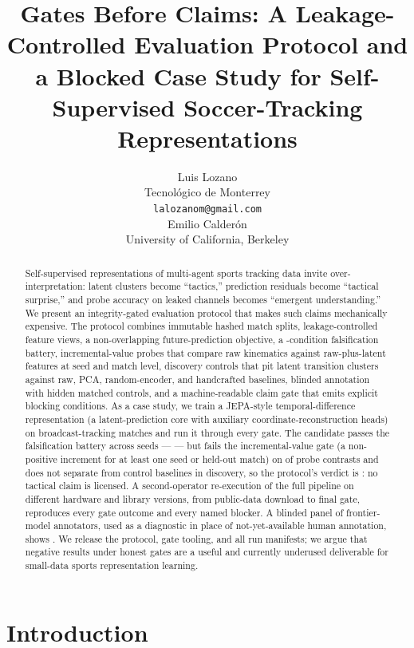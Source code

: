\documentclass{article}
\title{Gates Before Claims: A Leakage-Controlled Evaluation Protocol and a
Blocked Case Study for Self-Supervised Soccer-Tracking Representations}
\author{%
  Luis Lozano \\
  Tecnol\'ogico de Monterrey \\
  \texttt{lalozanom@gmail.com} \\
  \And
  Emilio Calder\'on \\
  University of California, Berkeley \\
}
\begin{document}
\maketitle

\begin{abstract}
Self-supervised representations of multi-agent sports tracking data invite
over-interpretation: latent clusters become ``tactics,'' prediction residuals
become ``tactical surprise,'' and probe accuracy on leaked channels becomes
``emergent understanding.'' We present an integrity-gated evaluation protocol
that makes such claims mechanically expensive. The protocol combines immutable
hashed match splits, leakage-controlled feature views, a non-overlapping
future-prediction objective, a \FalsConditionCount-condition falsification
battery, incremental-value probes that compare raw kinematics against
raw-plus-latent features at seed and match level, discovery controls that pit
latent transition clusters against raw, PCA, random-encoder, and handcrafted
baselines, blinded annotation with hidden matched controls, and a
machine-readable claim gate that emits explicit blocking conditions. As a case
study, we train a JEPA-style temporal-difference representation (a
latent-prediction core with auxiliary coordinate-reconstruction heads) on
\NumMatches{} broadcast-tracking matches and run it through every gate. The
candidate passes the falsification battery across \NumSeeds{} seeds ---
\FalsTestScopeClause{} --- but fails the incremental-value gate (a
non-positive increment for at least one seed or held-out match) on
\ProbeBlockedContrasts{} of \ProbeTotalContrasts{} probe contrasts and does not
separate from control baselines in discovery, so the protocol's verdict is
\emph{\GateOverallStatus}: no tactical claim is licensed. A second-operator
re-execution of the full pipeline on different hardware and library versions,
from public-data download to final gate, reproduces every gate outcome and
every named blocker. A blinded panel of \PanelAnnotatorCount{} frontier-model
annotators, used as a diagnostic in place of not-yet-available human
annotation, shows \PanelHeadline. We release the protocol, gate tooling, and
all run manifests; we argue that negative results under honest gates are a
useful and currently underused deliverable for small-data sports
representation learning.
\end{abstract}

\section{Introduction}
\label{sec:intro}
\end{document}
